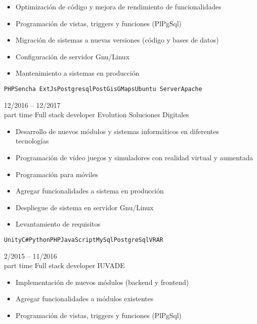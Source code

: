 \begin{entrylist}
{\begin{itemize}
    	        \item Optimización de código y mejora de rendimiento de funcionalidades
    	        \item Programación de vistas, triggers y funciones (PlPgSql)
    	        \item Migración de sistemas a nuevas versiones (código y bases de datos)
    	        \item Configuración de servidor Gnu/Linux
    	        \item Mantenimiento a sistemas en producción
    	    \end{itemize}
		    \texttt{PHP}\slashsep\texttt{Sencha ExtJs}\slashsep\texttt{Postgresql}\slashsep\texttt{PostGis}\slashsep\texttt{GMaps}\slashsep\texttt{Ubuntu Server}\slashsep\texttt{Apache}
        }
	\entry
		{12/2016 -- 12/2017\\\footnotesize{part time}}
		{Full stack developer}
		{Evolution Soluciones Digitales}
		{
		    \vspace{-5mm}
    	    \begin{itemize}
    	        \setlength\itemsep{0pt}
    	        \item Desarrollo de nuevos módulos y sistemas informáticos en diferentes tecnologías
    	        \item Programación de vídeo juegos y simuladores con realidad virtual y aumentada
    	        \item Programación para móviles
    	        \item Agregar funcionalidades a sistema en producción
    	        \item Despliegue de sistema en servidor Gnu/Linux
    	        \item Levantamiento de requisitos
    	    \end{itemize}\texttt{Unity}\slashsep\texttt{C\#}\slashsep\texttt{Python}\slashsep\texttt{PHP}\slashsep\texttt{JavaScript}\slashsep\texttt{MySql}\slashsep\texttt{PostgreSql}\slashsep\texttt{VR}\slashsep\texttt{AR}
        }
	\entry
		{2/2015 -- 11/2016\\\footnotesize{part time}}
		{Full stack developer}
		{IUVADE}
		{
		    \vspace{-5mm}
    	    \begin{itemize}
    	        \setlength\itemsep{0pt}
    	        \item Implementación de nuevos módulos (backend y frontend)
    	        \item Agregar funcionalidades a módulos existentes
    	        \item Programación de vistas, triggers y funciones (PlPgSql)

\end{itemize}}
\end{entrylist}
